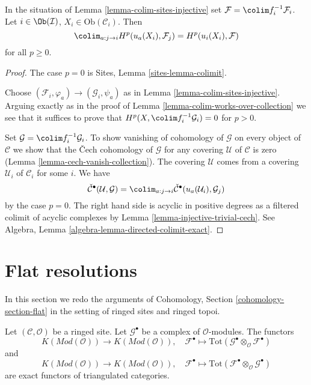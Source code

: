 \begin{lemma}
\label{lemma-colimit}
In the situation of Lemma \ref{lemma-colim-sites-injective} set
$\mathcal{F} = \colim f_i^{-1}\mathcal{F}_i$.
Let $i \in \Ob(\mathcal{I})$, $X_i \in \text{Ob}(\mathcal{C}_i)$. Then
$$
\colim_{a : j \to i} H^p(u_a(X_i), \mathcal{F}_j) =
H^p(u_i(X_i), \mathcal{F})
$$
for all $p \geq 0$.
\end{lemma}

\begin{proof}
The case $p = 0$ is Sites, Lemma \ref{sites-lemma-colimit}.

\medskip\noindent
Choose $(\mathcal{F}_i, \varphi_a) \to (\mathcal{G}_i, \psi_a)$
as in Lemma \ref{lemma-colim-sites-injective}.
Arguing exactly as in the proof of
Lemma \ref{lemma-colim-works-over-collection}
we see that it suffices to prove that
$H^p(X, \colim f_i^{-1}\mathcal{G}_i) = 0$ for $p > 0$.

\medskip\noindent
Set $\mathcal{G} = \colim f_i^{-1}\mathcal{G}_i$.
To show vanishing of cohomology of $\mathcal{G}$ on every object
of $\mathcal{C}$ we show that the {\v C}ech cohomology of $\mathcal{G}$
for any covering $\mathcal{U}$ of $\mathcal{C}$ is zero
(Lemma \ref{lemma-cech-vanish-collection}).
The covering $\mathcal{U}$ comes from a covering
$\mathcal{U}_i$ of $\mathcal{C}_i$ for some $i$. We have
$$
\check{\mathcal{C}}^\bullet(\mathcal{U}, \mathcal{G}) =
\colim_{a : j \to i}
\check{\mathcal{C}}^\bullet(u_a(\mathcal{U}_i), \mathcal{G}_j)
$$
by the case $p = 0$. The right hand side is acyclic in positive degrees
as a filtered colimit of acyclic complexes by
Lemma \ref{lemma-injective-trivial-cech}. See
Algebra, Lemma \ref{algebra-lemma-directed-colimit-exact}.
\end{proof}















\section{Flat resolutions}
\label{section-flat}

\noindent
In this section we redo the arguments of
Cohomology, Section \ref{cohomology-section-flat}
in the setting of ringed sites and ringed topoi.

\begin{lemma}
\label{lemma-derived-tor-exact}
Let $(\mathcal{C}, \mathcal{O})$ be a ringed site.
Let $\mathcal{G}^\bullet$ be a complex of $\mathcal{O}$-modules.
The functors
$$
K(\textit{Mod}(\mathcal{O}))
\longrightarrow
K(\textit{Mod}(\mathcal{O})),
\quad
\mathcal{F}^\bullet \longmapsto
\text{Tot}(\mathcal{G}^\bullet \otimes_\mathcal{O} \mathcal{F}^\bullet)
$$
and
$$
K(\textit{Mod}(\mathcal{O}))
\longrightarrow
K(\textit{Mod}(\mathcal{O})),
\quad
\mathcal{F}^\bullet \longmapsto
\text{Tot}(\mathcal{F}^\bullet \otimes_\mathcal{O} \mathcal{G}^\bullet)
$$
are exact functors of triangulated categories.
\end{lemma}

